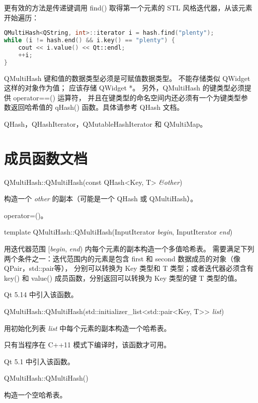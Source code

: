更有效的方法是传递键调用 find() 取得第一个元素的 STL 风格迭代器，从该元素开始遍历：

\begin{lstlisting}[language=C++]
QMultiHash<QString, int>::iterator i = hash.find("plenty");
while (i != hash.end() && i.key() == "plenty") {
    cout << i.value() << Qt::endl;
    ++i;
}
\end{lstlisting}

QMultiHash 键和值的数据类型必须是可赋值数据类型。
不能存储类似 QWidget 这样的对象作为值；
应该存储 QWidget *。
另外，QMultiHash 的键类型必须提供 operator==() 运算符， 
并且在键类型的命名空间内还必须有一个为键类型参数返回哈希值的 qHash() 函数。具体请参考 QHash 文档。

\begin{seeAlso}
QHash，QHashIterator，QMutableHashIterator 和 QMultiMap。
\end{seeAlso}

\section{成员函数文档}

QMultiHash::QMultiHash(const QHash<Key, T> \emph{\&other})

构造一个 \emph{other} 的副本（可能是一个 QHash 或 QMultiHash）。

\begin{seeAlso}
operator=()。
\end{seeAlso}

template QMultiHash::QMultiHash(InputIterator \emph{begin}, InputIterator \emph{end})

用迭代器范围 [\emph{begin}, \emph{end}) 内每个元素的副本构造一个多值哈希表。
需要满足下列两个条件之一：迭代范围内的元素是包含 first 和 second 数据成员的对象（像 QPair，std::pair等），
分别可以转换为 Key 类型和 T 类型；或者迭代器必须含有 key() 和 value() 成员函数，分别返回可以转换为 Key 类型的键 T 类型的值。

Qt 5.14 中引入该函数。

QMultiHash::QMultiHash(std::initializer\_list<std::pair<Key, T>> \emph{list})

用初始化列表 \emph{list} 中每个元素的副本构造一个哈希表。

只有当程序在 C++11 模式下编译时，该函数才可用。

Qt 5.1 中引入该函数。

QMultiHash::QMultiHash()

构造一个空哈希表。

